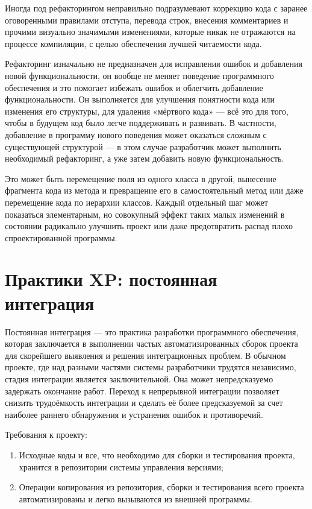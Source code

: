 \documentclass{article}
\begin{document}
    Иногда под рефакторингом неправильно подразумевают коррекцию кода с заранее оговоренными правилами отступа, перевода строк, внесения комментариев и прочими визуально значимыми изменениями, которые никак не отражаются на процессе компиляции, с целью обеспечения лучшей читаемости кода.

    Рефакторинг изначально не предназначен для исправления ошибок и добавления новой функциональности, он вообще не меняет поведение программного обеспечения и это помогает избежать ошибок и облегчить добавление функциональности. Он выполняется для улучшения понятности кода или изменения его структуры, для удаления «мёртвого кода» — всё это для того, чтобы в будущем код было легче поддерживать и развивать. В частности, добавление в программу нового поведения может оказаться сложным с существующей структурой — в этом случае разработчик может выполнить необходимый рефакторинг, а уже затем добавить новую функциональность.

    Это может быть перемещение поля из одного класса в другой, вынесение фрагмента кода из метода и превращение его в самостоятельный метод или даже перемещение кода по иерархии классов. Каждый отдельный шаг может показаться элементарным, но совокупный эффект таких малых изменений в состоянии радикально улучшить проект или даже предотвратить распад плохо спроектированной программы.

\section{Практики XP: постоянная интеграция}
    Постоянная интеграция — это практика разработки программного обеспечения, которая заключается в выполнении частых автоматизированных сборок проекта для скорейшего выявления и решения интеграционных проблем. В обычном проекте, где над разными частями системы разработчики трудятся независимо, стадия интеграции является заключительной. Она может непредсказуемо задержать окончание работ. Переход к непрерывной интеграции позволяет снизить трудоёмкость интеграции и сделать её более предсказуемой за счет наиболее раннего обнаружения и устранения ошибок и противоречий.

    Требования к проекту:
    \begin{enumerate}
        \item Исходные коды и все, что необходимо для сборки и тестирования проекта, хранится в репозитории системы управления версиями;
        \item Операции копирования из репозитория, сборки и тестирования всего проекта автоматизированы и легко вызываются из внешней программы.
    \end{enumerate}
\end{document}
